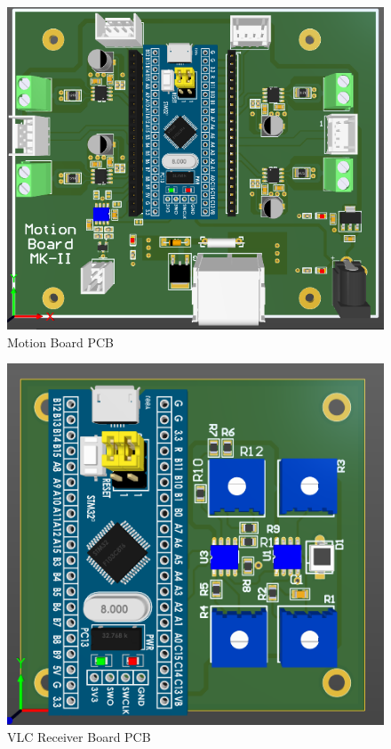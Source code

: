\newpage

\begin{figure}[h!]
	\centering
	\includegraphics[scale=0.8]{Figures/HW/pcb-motor-mk-ii.png}
	\caption{Motion Board PCB}
	\label{fig:hw-motion-pcb}
\end{figure}



\begin{figure}[h!]
	\centering
	\includegraphics[scale=0.8]{Figures/HW/pcb-vlc.png}
	\caption{VLC Receiver Board PCB}
	\label{fig:hwvlc-pcb}
\end{figure}







